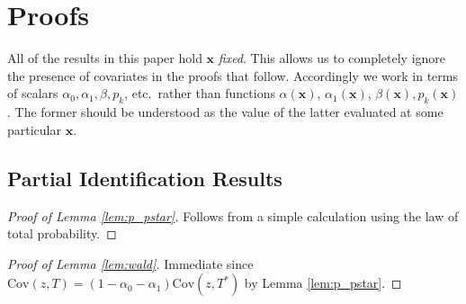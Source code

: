 \section{Proofs}
\label{sec:proofs}
All of the results in this paper hold $\mathbf{x}$ \emph{fixed}.
This allows us to completely ignore the presence of covariates in the proofs that follow.
Accordingly we work in terms of scalars $\alpha_0, \alpha_1, \beta, p_k$, etc.\ rather than functions $\alpha(\mathbf{x})$, $\alpha_1(\mathbf{x})$, $\beta(\mathbf{x}), p_k(\mathbf{x})$.
The former should be understood as the value of the latter evaluated at some particular $\mathbf{x}$.

\subsection{Partial Identification Results}
\begin{proof}[Proof of Lemma \ref{lem:p_pstar}]
  Follows from a simple calculation using the law of total probability.
\end{proof}

\begin{proof}[Proof of Lemma \ref{lem:wald}]
  Immediate since $\mbox{Cov}(z,T) = (1 - \alpha_0 - \alpha_1) \mbox{Cov}(z,T^*)$ by Lemma \ref{lem:p_pstar}.
\end{proof}

